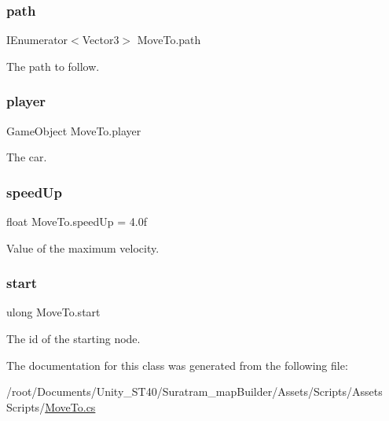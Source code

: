 \subsubsection{\texorpdfstring{path}{path}}
{\footnotesize\ttfamily I\+Enumerator$<$Vector3$>$ Move\+To.\+path\hspace{0.3cm}{\ttfamily [private]}}



The path to follow.

\mbox{\label{classMoveTo_aed2f4dbb8b9cbbc8a067f566faa89c6f}} 
\subsubsection{\texorpdfstring{player}{player}}
{\footnotesize\ttfamily Game\+Object Move\+To.\+player\hspace{0.3cm}{\ttfamily [private]}}



The car.

\mbox{\label{classMoveTo_acbebe9cc77ef109124f5234209b58c45}} 
\subsubsection{\texorpdfstring{speed\+Up}{speedUp}}
{\footnotesize\ttfamily float Move\+To.\+speed\+Up = 4.\+0f}



Value of the maximum velocity.

\mbox{\label{classMoveTo_a1e4eb520af3a9dc0ad9a28a00d6341a8}} 
\subsubsection{\texorpdfstring{start}{start}}
{\footnotesize\ttfamily ulong Move\+To.\+start}



The id of the starting node.



The documentation for this class was generated from the following file\+:\begin{DoxyCompactItemize}
\item 
/root/\+Documents/\+Unity\+\_\+\+S\+T40/\+Suratram\+\_\+map\+Builder/\+Assets/\+Scripts/\+Assets Scripts/\hyperlink{MoveTo_8cs}{Move\+To.\+cs}\end{DoxyCompactItemize}
